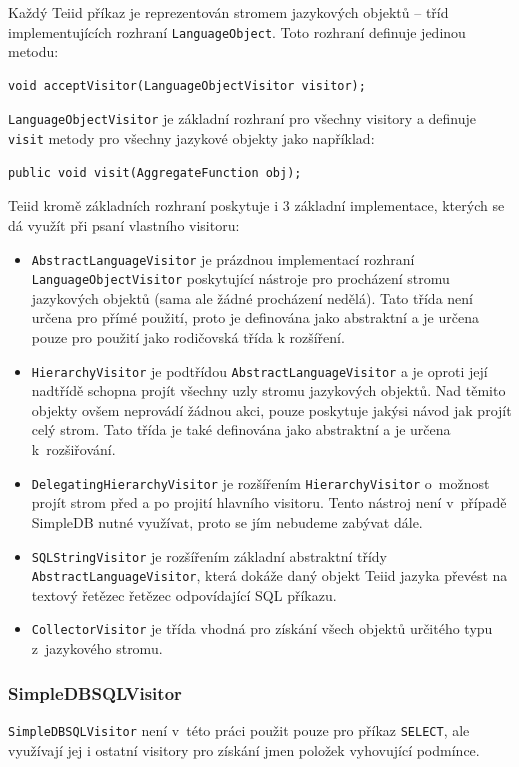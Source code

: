 \documentclass[oneside,12pt,final]{fithesis2}
\begin{document}
Každý Teiid příkaz je reprezentován stromem jazykových objektů -- tříd implementujících rozhraní \texttt{LanguageObject}. Toto rozhraní definuje jedinou metodu: 
\begin{Verbatim}[fontsize=\small]
void acceptVisitor(LanguageObjectVisitor visitor);
\end{Verbatim}
\texttt{LanguageObjectVisitor} je základní rozhraní pro všechny visitory a definuje \texttt{visit} metody pro všechny jazykové objekty jako například:
\begin{Verbatim}[fontsize=\small]
public void visit(AggregateFunction obj);
\end{Verbatim}
Teiid kromě základních rozhraní poskytuje i 3 základní implementace, kterých se dá využít při psaní vlastního visitoru:
\begin{itemize}
 \item \texttt{AbstractLanguageVisitor} je prázdnou implementací rozhraní \texttt{Language\allowbreak ObjectVisitor} poskytující nástroje pro procházení stromu jazykových objektů (sama ale žádné procházení nedělá). Tato třída není určena pro přímé použití, proto je definována jako abstraktní a je určena pouze pro použití jako rodičovská třída k rozšíření.
 \item \texttt{HierarchyVisitor} je podtřídou \texttt{AbstractLanguageVisitor} a je oproti její nadtřídě schopna projít všechny uzly stromu jazykových objektů. Nad těmito objekty ovšem neprovádí žádnou akci, pouze poskytuje jakýsi návod jak projít celý strom. Tato třída je také definována jako abstraktní a je určena k~rozšiřování.
 \item \texttt{DelegatingHierarchyVisitor} je rozšířením \texttt{HierarchyVisitor} o~možnost projít strom před a po projití hlavního visitoru. Tento nástroj není v~případě SimpleDB nutné využívat, proto se jím nebudeme zabývat dále.
 \item \texttt{SQLStringVisitor} je rozšířením základní abstraktní třídy \texttt{Abstract\allowbreak LanguageVisitor}, která dokáže daný objekt Teiid jazyka převést na textový řetězec řetězec odpovídající SQL příkazu.
 \item \texttt{CollectorVisitor} je třída vhodná pro získání všech objektů určitého typu z~jazykového stromu.
\end{itemize}

\subsubsection*{SimpleDBSQLVisitor}
\texttt{SimpleDBSQLVisitor} není v~této práci použit pouze pro příkaz \texttt{SELECT}, ale využívají jej i ostatní visitory pro získání jmen položek vyhovující podmínce. 
\end{document}
